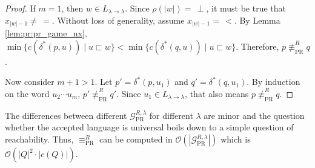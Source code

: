 \begin{proof}
	If $m = 1$, then $w \in L_{\lambda \rightarrow \lambda}$. Since $\rho(|w|) =\, \perp$, it must be true that $x_{|w|-1} \neq\, =$. Without loss of generality, assume $x_{|w|-1} =\, <$. By Lemma \ref{lem:pr:pr_game_nx}, $\min \{ c(\delta^*(p, u)) \mid u \sqsubset w \} < \min \{ c(\delta^*(q, u)) \mid u \sqsubset w \}$. Therefore, $p \not\equiv_\text{PR}^R q$.
	
	Now consider $m+1 > 1$. Let $p' = \delta^*(p, u_1)$ and $q' = \delta^*(q, u_1)$. By induction on the word $u_2 \cdots u_m$, $p' \not\equiv_\text{PR}^R q'$. Since $u_1 \in L_{\lambda \rightarrow \lambda}$, that also means $p \not\equiv_\text{PR}^R q$.
\end{proof}

The differences between different $\mathcal{G}_\text{PR}^{R,\lambda}$ for different $\lambda$ are minor and the question whether the accepted language is universal boils down to a simple question of reachability. Thus, $\equiv_\text{PR}^R$ can be computed in $\mathcal{O}(|\mathcal{G}_\text{PR}^{R,\lambda}|)$ which is $\mathcal{O}(|Q|^2 \cdot |c(Q)|)$.






















